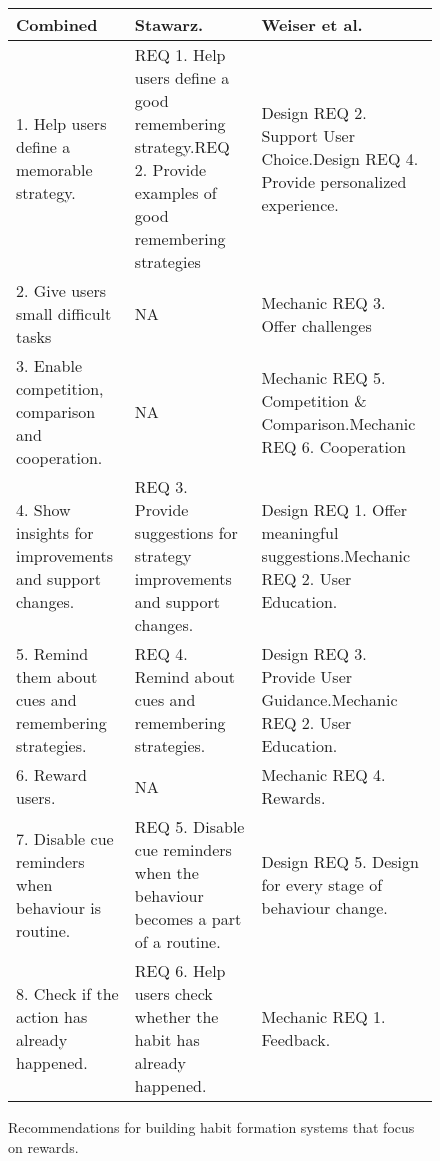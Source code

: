 \begin{landscape}
\renewcommand{\arraystretch}{1.5} %
\begin{figure}[ht] %


\begin{center}
\begin{tabular}{ |p{6.5cm}|p{6cm}|p{6cm}| }
  \hline
  \textbf{Combined} & \textbf{Stawarz.~\cite{thesis_kathy}} & \textbf{Weiser et al.~\cite{article_taxonomy_motivational_affordances_meaningful}} \\ \hline %
  1. Help users define a memorable strategy. & REQ 1. Help users define a good remembering strategy.\newline REQ 2. Provide examples of good remembering strategies & Design REQ 2. Support User Choice.\newline Design REQ 4. Provide personalized experience. \\ \hline
  2. Give users small difficult tasks & N\/A & Mechanic REQ 3. Offer challenges\\ \hline
  3. Enable competition, comparison and cooperation. & N\/A & Mechanic REQ 5. Competition \& Comparison.\newline Mechanic REQ 6. Cooperation\\ \hline
  4. Show insights for improvements and support changes. & REQ 3. Provide suggestions for strategy improvements and support changes. & Design REQ 1. Offer meaningful suggestions.\newline Mechanic REQ 2. User Education. \\ \hline
  5. Remind them about cues and remembering strategies. & REQ 4. Remind about cues and remembering strategies. & Design REQ 3. Provide User Guidance.\newline Mechanic REQ 2. User Education. \\ \hline
  6. Reward users. & N\/A & Mechanic REQ 4. Rewards. \\ \hline
  7. Disable cue reminders when behaviour is routine. & REQ 5. Disable cue reminders when the behaviour becomes a part of a routine. & Design REQ 5. Design for every stage of behaviour change. \\ \hline
  8. Check if the action has already happened. & REQ 6. Help users check whether the habit has already happened. & Mechanic REQ 1. Feedback. \\ \hline
\end{tabular}
\end{center}

    \caption{Recommendations for building habit formation systems that focus on rewards.}
    \label{fig:reqtable}
\end{figure}
\newpage
\end{landscape}

